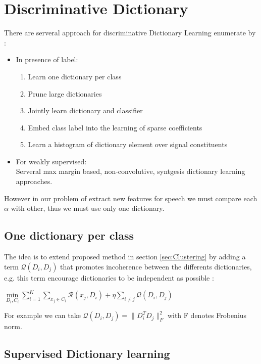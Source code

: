 \documentclass[a4paper,10pt]{article}
\begin{document}
\section{Discriminative Dictionary }
There are serveral approach for discriminative Dictionary Learning enumerate by \cite{8294264}:
\begin{itemize}
 \item In presence of label:
    \begin{enumerate}
     \item Learn one dictionary per class
     \item Prune large dictionaries
     \item Jointly learn dictionary and classifier
     \item Embed class label into the learning of sparse coefficients
     \item Learn a histogram of dictionary element over signal constituents
    \end{enumerate}

 \item For weakly supervised:\\
    Serveral max margin based, non-convolutive, syntgesis dictionary learning approaches.
\end{itemize}
However in our problem of extract new features for speech we must compare each $\alpha$ with other, thus we must use only one dictionary.
\subsection{One dictionary per class}
The idea is to extend proposed method in  section \ref{sec:Clustering} by adding a term $\mathcal{Q}(D_i,D_j)$ that promotes incoherence between the differents dictionaries, e.g. this term encourage dictionaries to  be independent as possible :
\begin{center}
 $\underset{D_i, C_i}{\min} \sum_{i=1}^{K} \sum_{x_j \in C_i} \mathcal{R}(x_j,D_i) + \eta \sum_{i \neq j} \mathcal{Q}(D_i,D_j)$
\end{center}
For example we can take $\mathcal{Q}(D_i,D_j) = \|D^T_iD_j\|^2_F $ with F denotes Frobenius norm.

\subsection{Supervised Dictionary learning}
\end{document}

